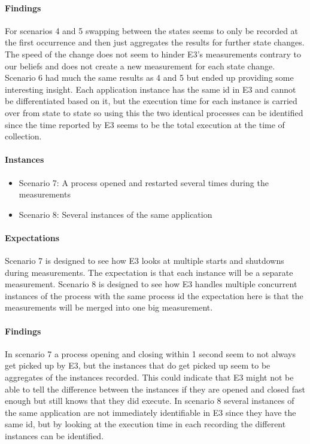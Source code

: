 \paragraph{Findings}
For scenarios 4 and 5 swapping between the states seems to only be recorded at the first occurrence and then just aggregates the results for further state changes. The speed of the change does not seem to hinder E3's measurements contrary to our beliefs and does not create a new measurement for each state change. Scenario 6 had much the same results as 4 and 5 but ended up providing some interesting insight. Each application instance has the same id in E3 and cannot be differentiated based on it, but the execution time for each instance is carried over from state to state so using this the two identical processes can be identified since the time reported by E3 seems to be the total execution at the time of collection.

\paragraph{Instances}

\begin{itemize}
    \item Scenario 7: A process opened and restarted several times during the measurements
    \item Scenario 8: Several instances of the same application
\end{itemize}

\paragraph{Expectations}
Scenario 7 is designed to see how E3 looks at multiple starts and shutdowns during measurements. The expectation is that each instance will be a separate measurement. Scenario 8 is designed to see how E3 handles multiple concurrent instances of the process with the same process id the expectation here is that the measurements will be merged into one big measurement. 
\paragraph{Findings}
In scenario 7 a process opening and closing within 1 second seem to not always get picked up by E3, but the instances that do get picked up seem to be aggregates of the instances recorded. This could indicate that E3 might not be able to tell the difference between the instances if they are opened and closed fast enough but still knows that they did execute. In scenario 8 several instances of the same application are not immediately identifiable in E3 since they have the same id, but by looking at the execution time in each recording the different instances can be identified.

